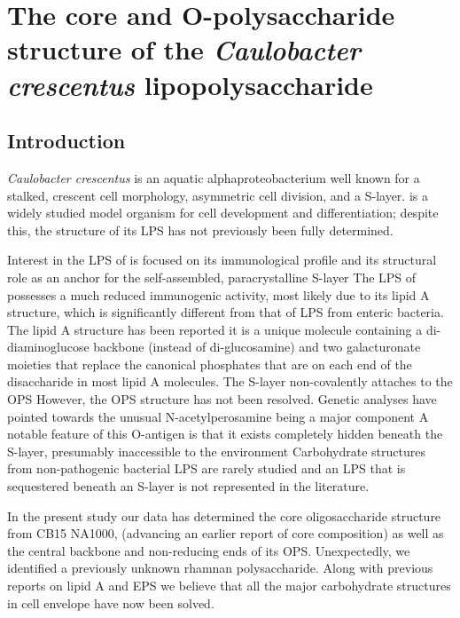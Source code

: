 \acresetall

\chapter{The core and O-polysaccharide structure of the \textit{Caulobacter crescentus} lipopolysaccharide}
\label{ch:lps}

\section{Introduction} %
\label{sec:introduction} 
	\textit{Caulobacter crescentus} is an aquatic alphaproteobacterium well known for a stalked, crescent cell morphology, asymmetric cell division, and a \ac{S-layer}. \caulobacter is a widely studied model organism for cell development and differentiation; despite this, the structure of its \ac{LPS} has not previously been fully determined.

	Interest in the \ac{LPS} of \caulobacter is focused on its immunological profile and its structural role as an anchor for the self-assembled, paracrystalline \ac{S-layer} The \ac{LPS} of \caulobacter possesses a much reduced immunogenic activity, most likely due to its lipid A structure, which is significantly different from that of \ac{LPS} from enteric bacteria. The lipid A structure has been reported it is a unique molecule containing a di-diaminoglucose backbone (instead of di-glucosamine) and two galacturonate moieties that replace the canonical phosphates that are on each end of the disaccharide in most lipid A molecules. The \caulobacter \ac{S-layer} non-covalently attaches to the \ac{OPS} However, the \ac{OPS} structure has not been resolved. Genetic analyses have pointed towards the unusual N-acetylperosamine being a major component A notable feature of this O-antigen is that it exists completely hidden beneath the S-layer, presumably inaccessible to the environment Carbohydrate structures from non-pathogenic bacterial \ac{LPS} are rarely studied and an \ac{LPS} that is sequestered beneath an \ac{S-layer} is not represented in the literature.

	In the present study our data has determined the core oligosaccharide structure from \caulobacter CB15 NA1000, (advancing an earlier report of core composition) as well as the central backbone and non-reducing ends of its OPS. Unexpectedly, we identified a previously unknown rhamnan polysaccharide. Along with previous reports on lipid A and \ac{EPS} we believe that all the major carbohydrate structures in \caulobacter cell envelope have now been solved.

